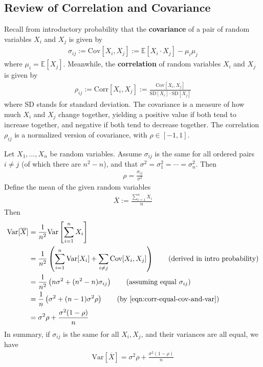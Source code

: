 \documentclass[12pt, a4paper]{article}
\theoremstyle{definition}
\begin{document}
	\subsection*{Review of Correlation and Covariance}
	Recall from introductory probability that the \textbf{covariance}
	of a pair of random variables $X_i$ and $X_j$ is given by
	\begin{align*}
		\sigma_{ij} := \text{Cov}[X_i,X_j] := \mathbb{E}[X_i\cdot X_j] - \mu_i\mu_j
	\end{align*}
	where $\mu_i = \mathbb{E}[X_j]$.
	Meanwhile, the \textbf{correlation} of random variables $X_i$ and $X_j$
	is given by
	\begin{align*}
		\rho_{ij} := \text{Corr}[X_i,X_j] := \frac{\text{Cov}[X_i,X_j]}{\text{SD}[X_i]\cdot \text{SD}[X_j]}
	\end{align*}
	where SD stands for standard deviation.
	The covariance is a measure of how much $X_i$ and $X_j$ change together,
	yielding a positive value if both tend to increase together, and negative
	if both tend to decrease together. The correlation $\rho_{ij}$ is a normalized
	version of covariance, with $\rho\in [-1, 1]$.
	
	Let $X_1,\ldots,X_n$ be random variables. Assume $\sigma_{ij}$ is the same for all
	ordered pairs $i\neq j$ (of which there are $n^2 - n$), and that
	$\sigma^2 = \sigma_1^2 = \cdots = \sigma_n^2$. Then
	\begin{align}
		\rho = \frac{\sigma_{ij}}{\sigma^2}
		\label{eqn:corr-equal-cov-and-var}
	\end{align}
	Define the mean of the given random variables
	\begin{align*}
		\overline{X} := \frac{\sum_{i=1}^{n}X_i}{n}
	\end{align*}
	Then
	\begin{align*}
		\text{Var}[\overline{X}]
		&= \frac{1}{n^2}\text{Var}\left[\sum_{i=1}^{n}X_i\right]\\
		&= \frac{1}{n^2}\left(
		\sum_{i=1}^{n}\text{Var}[X_i] + \sum_{i\neq j}\text{Cov}[X_i,X_j]
		\right)\tag{derived in intro probability}\\
		&= \frac{1}{n^2}\left(
		n\sigma^2 + (n^2-n)\sigma_{ij}
		\right)\tag{assuming equal $\sigma_{ij}$}\\
		&= \frac{1}{n}\left(
		\sigma^2 + (n - 1)\sigma^2 \rho
		\right)
		\tag{by \ref{eqn:corr-equal-cov-and-var}}\\
		&=\sigma^2\rho + \frac{\sigma^2(1-\rho)}{n}
	\end{align*}
	In summary, if $\sigma_{ij}$ is the same for all $X_i, X_j$,
	and their variances are all equal, we have
	\begin{align}
		\text{Var}[\overline{X}] = \sigma^2\rho + \frac{\sigma^2 (1-\rho)}{n}
		\label{eqn:variance-Xbar}
	\end{align}
\end{document}
